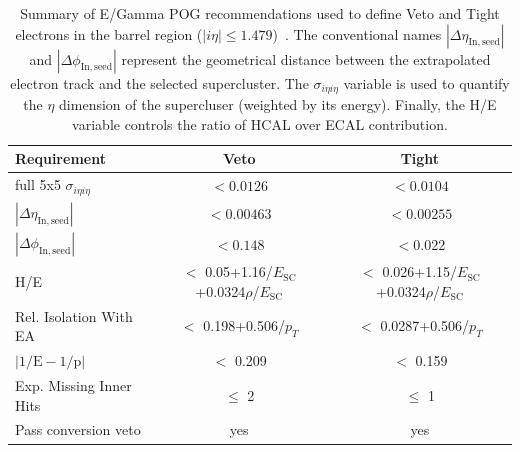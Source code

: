\begin{table}[h]
\footnotesize
\centering
\begin{tabular}{|l|c|c|}
\hline\hline
Requirement    & Veto  & Tight             \\\hline
full 5x5 $\sigma_{i\eta i\eta}$ &  $< 0.0126$ &   $< 0.0104$    \\
$|\Delta\eta_{\mathrm{In,seed}}|$ & $< 0.00463$ & $< 0.00255$ \\
$|\Delta\phi_{\mathrm{In, seed}}|$ & $< 0.148$ & $< 0.022$ \\
H/E & $<$ 0.05+1.16/$E_{\mathrm{SC}}$+0.0324$\rho$/$E_{\mathrm{SC}}$ & $<$ 0.026+1.15/$E_{\mathrm{SC}}$+0.0324$\rho$/$E_{\mathrm{SC}}$ \\
Rel. Isolation With EA & $<$ 0.198+0.506/$p_T$	& $<$ 0.0287+0.506/$p_T$\\
$|1/\mathrm{E} - 1/\mathrm{p}|$ & $<$ 0.209	& $<$ 0.159\\
Exp. Missing Inner Hits & $\leq$ 2&	 $\leq$ 1\\
Pass conversion veto & yes	& yes \\
\hline\hline
\end{tabular}
\caption{Summary of E/Gamma POG recommendations used to define Veto and Tight electrons in the barrel region ($|i\eta|\leq 1.479$)~\cite{twiki_egamma_1,twiki_egamma_2,note:AN_19_257}. The conventional names $|\Delta\eta_{\mathrm{In,seed}}|$ and $|\Delta\phi_{\mathrm{In,seed}}|$ represent the geometrical distance between the extrapolated electron track and the selected supercluster. The $\sigma_{i\eta i\eta}$ variable is used to quantify the $\eta$ dimension of the supercluser (weighted by its energy). Finally, the H/E variable controls the ratio of HCAL over ECAL contribution.}
\label{tab:electronIDb2017}
\end{table}

